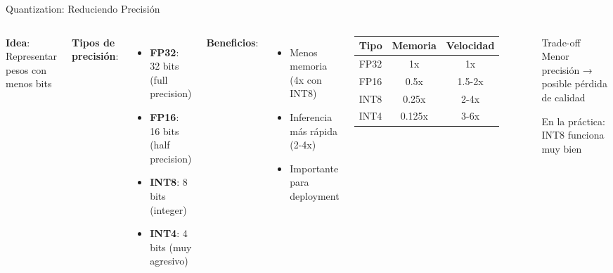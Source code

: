 \begin{frame}{Quantization: Reduciendo Precisión}

\begin{columns}
\textbf{Idea}: Representar pesos con menos bits

\vspace{0.5em}

\textbf{Tipos de precisión}:
\begin{itemize}
    \item \textbf{FP32}: 32 bits (full precision)
    \item \textbf{FP16}: 16 bits (half precision)
    \item \textbf{INT8}: 8 bits (integer)
    \item \textbf{INT4}: 4 bits (muy agresivo)
\end{itemize}

\vspace{0.5em}

\textbf{Beneficios}:
\begin{itemize}
    \item Menos memoria (4x con INT8)
    \item Inferencia más rápida (2-4x)
    \item Importante para deployment
\end{itemize}

\begin{table}[]
\centering
\small
\begin{tabular}{|l|c|c|}
\hline
\textbf{Tipo} & \textbf{Memoria} & \textbf{Velocidad} \\ \hline
FP32 & 1x & 1x \\ \hline
FP16 & 0.5x & 1.5-2x \\ \hline
INT8 & 0.25x & 2-4x \\ \hline
INT4 & 0.125x & 3-6x \\ \hline
\end{tabular}
\end{table}

\vspace{0.5em}

\begin{alertblock}{Trade-off}
Menor precisión → posible pérdida de calidad

En la práctica: INT8 funciona muy bien
\end{alertblock}

\end{columns}

\end{frame}

